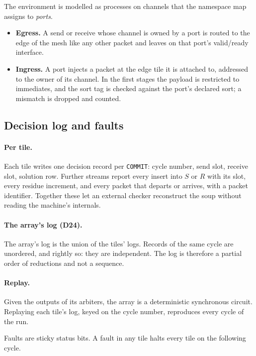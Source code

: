 \documentclass[11pt]{article}
\newcommand{\kw}[1]{\texttt{#1}}
\newcommand{\dec}[1]{\textbf{D#1}}
\theoremstyle{definition}
\theoremstyle{remark}
\begin{document}
The environment is modelled as processes on channels that the namespace map
assigns to \emph{ports}.
\begin{itemize}
\item \textbf{Egress.} A send or receive whose channel is owned by a port is
routed to the edge of the mesh like any other packet and leaves on that
port's valid/ready interface.
\item \textbf{Ingress.} A port injects a packet at the edge tile it is
attached to, addressed to the owner of its channel. In the first stages the
payload is restricted to immediates, and the sort tag is checked against the
port's declared sort; a mismatch is dropped and counted.
\end{itemize}

\subsection{Decision log and faults}\label{sec:log}

\paragraph{Per tile.} Each tile writes one decision record per \kw{COMMIT}:
cycle number, send slot, receive slot, solution row. Further streams report
every insert into $S$ or $R$ with its slot, every residue increment, and
every packet that departs or arrives, with a packet identifier. Together
these let an external checker reconstruct the soup without reading the
machine's internals.

\paragraph{The array's log (\dec{24}).} The array's log is the union of the
tiles' logs. Records of the same cycle are unordered, and rightly so: they
are independent. The log is therefore a partial order of reductions and not
a sequence.

\paragraph{Replay.} Given the outputs of its arbiters, the array is a
deterministic synchronous circuit. Replaying each tile's log, keyed on the
cycle number, reproduces every cycle of the run.

Faults are sticky status bits. A fault in any tile halts every tile on the
following cycle.
\end{document}
